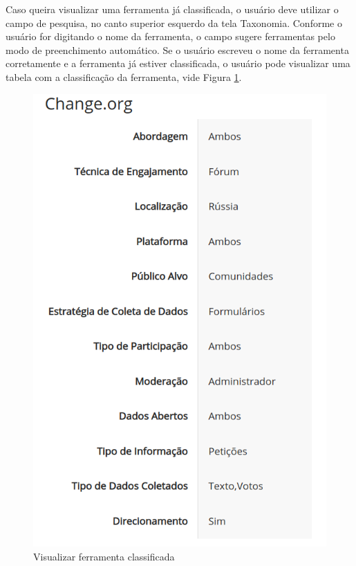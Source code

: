 \par
Caso queira visualizar uma ferramenta já classificada, o usuário deve utilizar o campo de pesquisa, no canto superior esquerdo da tela Taxonomia.
Conforme o usuário for digitando o nome da ferramenta, o campo sugere ferramentas pelo modo de preenchimento automático. Se o usuário escreveu o nome da ferramenta corretamente 
e a ferramenta já estiver classificada, o usuário pode visualizar uma tabela com a classificação da 
ferramenta, vide Figura \ref{fig:show-ferramenta}.

\vspace{0.5cm}

\begin{figure}[!ht]
    \centering
    \includegraphics[scale=0.20]{./figuras/show-ferramenta.png}
    \caption{Visualizar ferramenta classificada}
    \label{fig:show-ferramenta}
\end{figure}


